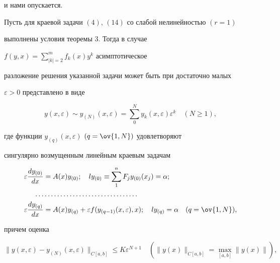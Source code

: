 и нами опускается. 


 


\begin{thm} 


Пусть для краевой задачи $(4)$, $(14)$ со слабой нелинейностью $(r=1)$ 


выполнены условия теоремы $3$. Тогда в случае 


$f(y,x)=\sum\limits^m_{|k|=2}f_k(x)y^k$ асимптотическое 


разложение решения указанной задачи может быть при достаточно малых 


$\varepsilon>0$ представлено в виде 


$$ 


y(x,\varepsilon)\sim y_{(N)}(x,\varepsilon)= 


\sum^N_0 y_k(x,\varepsilon)\varepsilon^k\quad (N\ge 1), 


$$ 


где функции $y_{(q)}(x,\varepsilon)$ $(q=\ov{1,N})$ удовлетворяют 


сингулярно возмущенным линейным краевым задачам 


\begin{equation} 


\begin{split} 


\varepsilon\frac{dy_{(0)}}{dx}&=A(x)y_{(0)};\quad 


l y_{(0)}\equiv\sum^n_1 F_j y_{(0)}(x_j)=\alpha;\\ 


\dotsc&\dotsc\dotsc\dotsc\dotsc\dotsc\dotsc\dotsc\dotsc\dotsc\dotsc \\ 


\varepsilon\frac{dy_{(q)}}{dx}&=A(x)y_{(q)}+ 


\varepsilon f(y_{(q-1)}(x,\varepsilon),x);\quad 


l y_{(q)}=\alpha\quad (q=\ov{1,N}), 


\end{split} 


\end{equation} 


причем оценка 


\begin{equation} 


\|y(x,\varepsilon)-y_{(N)}(x,\varepsilon)\|_{C[a,b]}\le 


K \varepsilon^{N+1}\quad (\|y(x)\|_{C[a,b]}= 


\max_{[a,b]}\|y(x)\|), 



\end{equation}
\end{thm}
